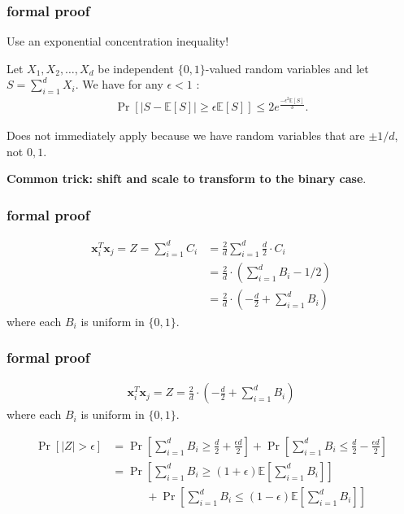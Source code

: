 \documentclass[compress]{beamer}
\newcommand{\bv}[1]{\mathbf{#1}}
\newcommand{\E}{\mathbb{E}}
\begin{document}
\begin{frame}
	\frametitle{formal proof}
	Use an exponential concentration inequality!
	\begin{theorem}
		Let $X_1,X_2,\ldots,X_d$ be independent $\{0,1\}$-valued random variables and let
		$S = \sum_{i=1}^{d} X_i$. We have for any $\epsilon < 1$ :
		\begin{align*}
			\Pr[|S - \E[S]| \geq \epsilon\E[S]] \leq 2e^{\frac{-\epsilon^2\E[S]}{3}}.
		\end{align*}
	\end{theorem} 
Does not immediately apply because we have random variables that are $\pm 1/{d}$, not $0,1$.

	\textbf{Common trick: shift and scale to transform to the binary case}.
\end{frame}

\begin{frame}[t]
	\frametitle{formal proof}

	\begin{align*}
		\bv{x}_i^T\bv{x}_j = Z = \sum_{i=1}^d C_i &= \frac{2}{d} \sum_{i=1}^d \frac{d}{2}\cdot C_i\\
		&= \frac{2}{d}\cdot \left(\sum_{i=1}^d B_i - 1/2\right)\\
		&= \frac{2}{d}\cdot \left(-\frac{d}{2} + \sum_{i=1}^d B_i \right)
	\end{align*}
	where each $B_i$ is uniform in $\{0,1\}$. 
\end{frame}



\begin{frame}[t]
		\frametitle{formal proof}
	\begin{align*}
		\bv{x}_i^T\bv{x}_j = Z = \frac{2}{d}\cdot \left(-\frac{d}{2} + \sum_{i=1}^d B_i \right)
	\end{align*}
	where each $B_i$ is uniform in $\{0,1\}$. 
	
	\begin{align*}
		\Pr[|Z| > \epsilon] &= \Pr\left[\sum_{i=1}^d B_i \geq \frac{d}{2} + \frac{\epsilon d}{2}\right] +\Pr\left[\sum_{i=1}^d B_i \leq \frac{d}{2} - \frac{\epsilon d}{2}\right ]\\
		& = \Pr\left[\sum_{i=1}^d B_i \geq (1+\epsilon)\E\left[\sum_{i=1}^d B_i\right ]\right] \\ &\hspace{3em}+ \Pr\left[\sum_{i=1}^d B_i \leq (1-\epsilon)\E\left[\sum_{i=1}^d B_i\right ]\right]
	\end{align*}
\end{frame}
\end{document}
